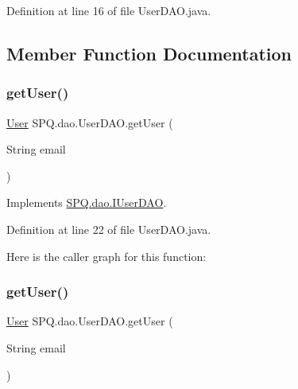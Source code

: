 Definition at line 16 of file User\+D\+A\+O.\+java.



\subsection{Member Function Documentation}
\mbox{\label{class_s_p_q_1_1dao_1_1_user_d_a_o_aeb3901e9e260ad977a1b412fe7a9fc0e}} 
\subsubsection{\texorpdfstring{get\+User()}{getUser()}\hspace{0.1cm}{\footnotesize\ttfamily [1/3]}}
{\footnotesize\ttfamily \mbox{\hyperlink{class_s_p_q_1_1data_1_1_user}{User}} S\+P\+Q.\+dao.\+User\+D\+A\+O.\+get\+User (\begin{DoxyParamCaption}\item[{String}]{email }\end{DoxyParamCaption})}



Implements \mbox{\hyperlink{interface_s_p_q_1_1dao_1_1_i_user_d_a_o_ac53b137d5e0828058457e59fa70c2b95}{S\+P\+Q.\+dao.\+I\+User\+D\+AO}}.



Definition at line 22 of file User\+D\+A\+O.\+java.

Here is the caller graph for this function\+:
\mbox{\label{class_s_p_q_1_1dao_1_1_user_d_a_o_aeb3901e9e260ad977a1b412fe7a9fc0e}} 
\subsubsection{\texorpdfstring{get\+User()}{getUser()}\hspace{0.1cm}{\footnotesize\ttfamily [2/3]}}
{\footnotesize\ttfamily \mbox{\hyperlink{class_s_p_q_1_1data_1_1_user}{User}} S\+P\+Q.\+dao.\+User\+D\+A\+O.\+get\+User (\begin{DoxyParamCaption}\item[{String}]{email }\end{DoxyParamCaption})}



